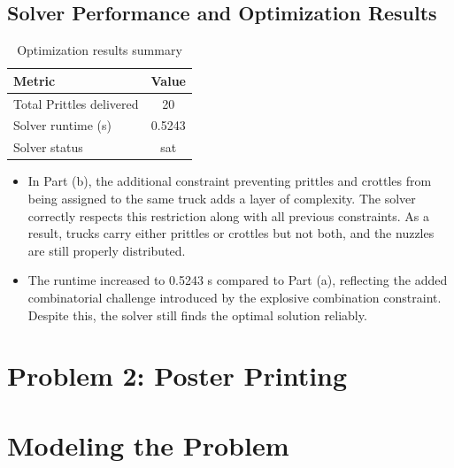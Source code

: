 \documentclass{article}
\begin{document}
\subsection{Solver Performance and Optimization Results}

\begin{table}[h!]
\centering
\caption{Optimization results summary}
\begin{tabular}{l c}
\toprule
Metric & Value \\
\midrule
Total Prittles delivered & 20 \\
Solver runtime (s) & 0.5243 \\
Solver status & sat \\
\bottomrule
\end{tabular}
\end{table}

\begin{itemize}
    \item   
    In Part (b), the additional constraint preventing prittles and crottles from being assigned to the same truck adds a layer of complexity. The solver correctly respects this restriction along with all previous constraints. As a result, trucks carry either prittles or crottles but not both, and the nuzzles are still properly distributed.
    
    \item   
    The runtime increased to 0.5243 s compared to Part (a), reflecting the added combinatorial challenge introduced by the explosive combination constraint. Despite this, the solver still finds the optimal solution reliably.
\end{itemize}

\section*{Problem 2: Poster Printing}

\setcounter{section}{0}
\section{Modeling the Problem}
\end{document}
